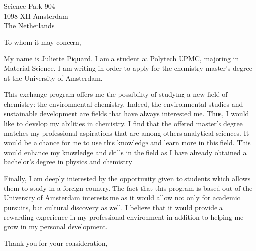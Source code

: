 \documentclass[pagesize,enlargefirstpage=on,fontsize=12pt,juliette]{scrlttr2}
\begin{document}
\begin{letter}{Science Park 904 \\ 1098 XH Amsterdam \\ The Netherlands}

    \opening{To whom it may concern,}



    My name is Juliette Piquard. I am a student at Polytech UPMC, majoring in
    Material Science. I am writing in order to apply for the chemistry master's
    degree at the University of Amsterdam.

    This exchange program offers me the possibility of studying a new field of
    chemistry: the environmental chemistry.  Indeed, the environmental studies and
    sustainable development are fields that have always interested me. Thus,  I
    would like to develop my abilities in chemistry. I find that the offered
    master’s degree matches my professional aspirations that are among others
    analytical sciences. It would be a chance for me to use this knowledge and
    learn more in this field. This would enhance my knowledge and skills in the
    field as I have already obtained a bachelor’s degree in physics and chemistry

    Finally, I am deeply interested by the opportunity given to students which
    allows them to study in a foreign country. The fact that this program is based
    out of the University of Amsterdam interests me as it would allow not only for
    academic pursuits, but cultural discovery as well.  I believe that it would
    provide a rewarding experience in my professional environment in addition to
    helping me grow in my personal development.

    \closing{Thank you for your consideration,}

\end{letter}
\end{document}
